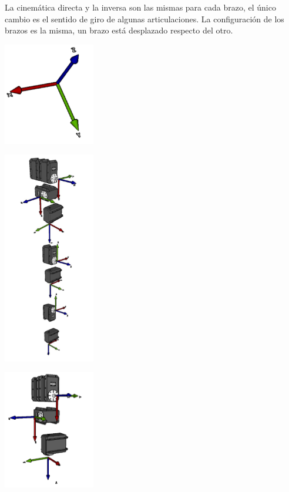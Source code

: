 \documentclass[user_manual.tex]{subfiles}
\begin{document}
La cinemática directa y la inversa son las mismas para cada brazo, el único cambio es el sentido de giro de algunas articulaciones. La configuración de los brazos es la misma, un brazo está desplazado respecto del otro.

\begin{center}
\includegraphics[width=0.3\textwidth]{Figures/Hardware/Cinematica/Cine_1.png}
\end{center}

\newpage

\begin{center}
\includegraphics[width=0.3\textwidth]{Figures/Hardware/Cinematica/Cine_2.png}
\end{center}

\begin{center}
\includegraphics[width=0.3\textwidth]{Figures/Hardware/Cinematica/Cine_3.png}
\end{center}
\end{document}
